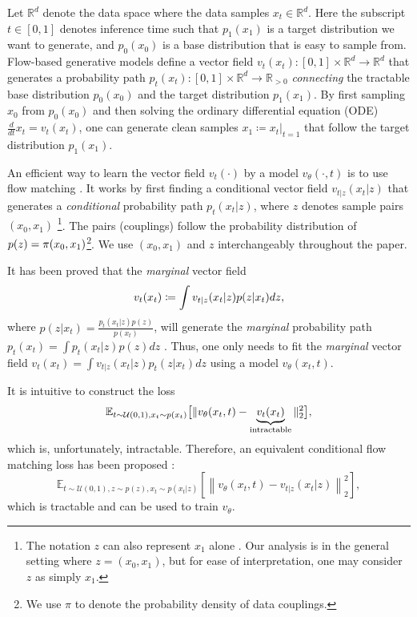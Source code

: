 


Let $\mathbb{R}^d$ denote the data space where the data samples $x_t\in \mathbb{R}^d$. Here the subscript $t\in[0,1]$ denotes inference time such that $p_1(x_1)$ is a target distribution we want to generate, and $p_0(x_0)$ is a base distribution that is easy to sample from. 
Flow-based generative models \citep{lipman_flow_2023,lipman_flow_2024} define a vector field
$v_t(x_t): [0,1] \times \mathbb{R}^d \to \mathbb{R}^d$ that generates a 
probability path $p_t(x_t):[0,1]\times\mathbb{R}^d\to \mathbb{R}_{>0}$  \emph{connecting} the tractable base distribution $p_0(x_0)$ and the target distribution $p_1(x_1)$.
By first sampling $x_0$ from $p_0(x_0)$ and then solving the ordinary differential equation (ODE) 
$\frac{d}{dt}x_t = v_t(x_t)$, one can generate clean samples $x_1\coloneqq x_t|_{t=1}$ that follow the target distribution $p_1(x_1)$.

An efficient way to learn the vector field $v_t(\cdot)$ by a model $v_\theta(\cdot, t)$ is to use flow matching 
\citep{lipman_flow_2023,lipman_flow_2024,tong_improving_2024}.
It works by first finding a conditional vector field $v_{t|z}(x_t|z)$ that generates
a \textit{conditional} probability path $p_t(x_t|z)$, where $z$ denotes sample pairs $(x_0,x_1)$
\footnote{The notation $z$ can also represent $x_1$ alone \citep{lipman_flow_2024}. Our analysis is in the general setting where $z=(x_0,x_1)$, but for ease of interpretation, one may consider $z$ as simply $x_1$.}.
The pairs (couplings) follow the probability distribution of $p(z)=\pi(x_0,x_1)$\footnote{We use $\pi$ to denote the probability density of data couplings.}. 
We use $(x_0,x_1)$ and $z$ interchangeably throughout the paper.


It has been proved that the \textit{marginal} vector field
\vspace{-5pt}
\begin{equation}\nonumber
\vspace{-5pt}
    v_t(x_t) \coloneqq \int v_{t|z}(x_t|z) p(z|x_t) dz,
\end{equation}
where $p(z|x_t) = \frac{p_t(x_t|z)p(z)}{p(x_t)}$,
will generate the \textit{marginal} probability path $p_t(x_t) = \int p_t(x_t|z) p(z) dz$ \citep{lipman_flow_2023}. 
Thus, one only needs to fit the \textit{marginal} vector field
$v_t(x_t) = \int v_{t|z}(x_t|z) p_t(z|x_t) dz$
using a model $v_\theta (x_t,t)$.

It is intuitive to construct the loss 
\begin{equation}\nonumber
    \mathbb{E}_{t\sim\mathcal{U}(0,1),x_t\sim p(x_t)}
    \big[\|v_\theta (x_t,t) - \underbrace{v_t(x_t)}_\text{intractable}\|^2_2\big],
    \vspace{-5pt}
\end{equation}
which is, unfortunately, intractable. 
Therefore, an equivalent conditional flow matching loss has been proposed
\citep{lipman_flow_2023,tong_improving_2024}:
\vspace{-2.5pt}
\begin{equation}\nonumber
    \mathbb{E}_{t\sim\mathcal{U}(0,1),z\sim p(z),x_t \sim p(x_t|z)} 
    \left[ \left\| v_\theta (x_t,t) - v_{t|z}(x_t|z) \right\|^2_2 \right],
\end{equation}
which is tractable and can be used to train $v_\theta$.
